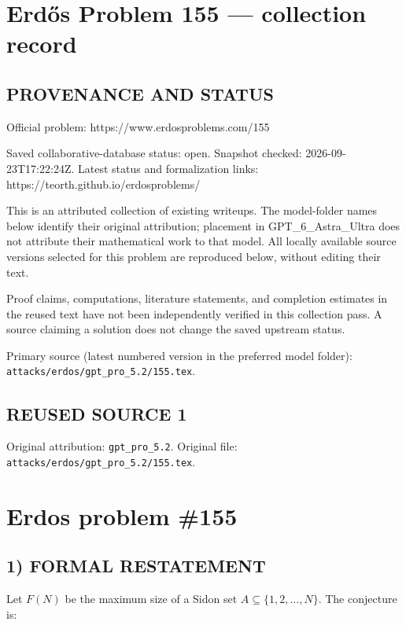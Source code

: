 \section*{Erd\H{o}s Problem 155 --- collection record}

\subsection*{PROVENANCE AND STATUS}
Official problem: https://www.erdosproblems.com/155

Saved collaborative-database status: open.
Snapshot checked: 2026-09-23T17:22:24Z.
Latest status and formalization links: https://teorth.github.io/erdosproblems/

This is an attributed collection of existing writeups. The model-folder names below identify their original attribution; placement in GPT\_6\_Astra\_Ultra does not attribute their mathematical work to that model. All locally available source versions selected for this problem are reproduced below, without editing their text.

Proof claims, computations, literature statements, and completion estimates in the reused text have not been independently verified in this collection pass. A source claiming a solution does not change the saved upstream status.

Primary source (latest numbered version in the preferred model folder): \texttt{attacks/erdos/gpt\_pro\_5.2/155.tex}.

\subsection*{REUSED SOURCE 1}
Original attribution: \texttt{gpt\_pro\_5.2}.
Original file: \texttt{attacks/erdos/gpt\_pro\_5.2/155.tex}.

\section*{Erdos problem \#155}

\subsection*{1) FORMAL RESTATEMENT}
Let $F(N)$ be the maximum size of a Sidon set $A\subseteq\{1,2,\dots,N\}$.
The conjecture is:

